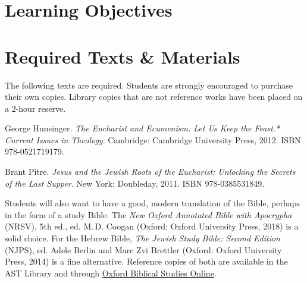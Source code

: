 \documentclass[titlepage]{article}
\newcommand\incl{../includes}
\begin{document}


  \section{Learning Objectives}
  \label{objectives}

  \edobject

\section{Required Texts \& Materials}
\label{texts}

The following texts are required. Students are strongly encouraged to
purchase their own copies. Library copies that are not reference works
have been placed on a 2-hour reserve.

\begingroup
\renewcommand{\section}[2]{}%
\begin{thebibliography}{9}%

	 George Hunsinger.
	\emph{The Eucharist and Ecumenism: Let Us Keep the Feast.* Current Issues in Theology}.
	Cambridge: Cambridge University Press, 2012. ISBN 978-0521719179.

	 Brant Pitre.
	\emph{Jesus and the Jewish Roots of the Eucharist: Unlocking the Secrets of the Last Supper}.
	New York: Doubleday, 2011. ISBN 978-0385531849.


%


\end{thebibliography}
\endgroup

Students will also want to have a good, modern translation of the Bible,
perhaps in the form of a study Bible. The \emph{New Oxford Annotated
Bible with Apocrypha} (NRSV), 5th ed., ed. M.\,D. Coogan (Oxford: Oxford
University Press, 2018) is a solid choice. For the Hebrew Bible,
\emph{The Jewish Study Bible: Second Edition} (NJPS), ed. Adele Berlin
and Marc Zvi Brettler (Oxford: Oxford University Press, 2014) is a fine
alternative. Reference copies of both are available in the AST Library
and through \href{http://ezproxy.astheology.ns.ca:2048/login?url=http://www.oxfordbiblicalstudies.com/}{Oxford Biblical Studies Online}.
\end{document}
